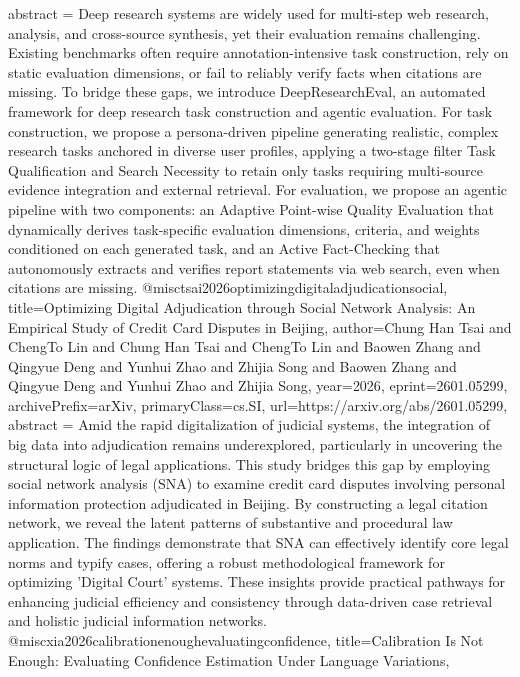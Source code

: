 {      abstract = {Deep research systems are widely used for multi-step web research, analysis, and cross-source synthesis, yet their evaluation remains challenging. Existing benchmarks often require annotation-intensive task construction, rely on static evaluation dimensions, or fail to reliably verify facts when citations are missing. To bridge these gaps, we introduce DeepResearchEval, an automated framework for deep research task construction and agentic evaluation. For task construction, we propose a persona-driven pipeline generating realistic, complex research tasks anchored in diverse user profiles, applying a two-stage filter Task Qualification and Search Necessity to retain only tasks requiring multi-source evidence integration and external retrieval. For evaluation, we propose an agentic pipeline with two components: an Adaptive Point-wise Quality Evaluation that dynamically derives task-specific evaluation dimensions, criteria, and weights conditioned on each generated task, and an Active Fact-Checking that autonomously extracts and verifies report statements via web search, even when citations are missing.}
}@misc{tsai2026optimizingdigitaladjudicationsocial,
      title={Optimizing Digital Adjudication through Social Network Analysis: An Empirical Study of Credit Card Disputes in Beijing}, 
      author={Chung Han Tsai and ChengTo Lin and Chung Han Tsai and ChengTo Lin and Baowen Zhang and Qingyue Deng and Yunhui Zhao and Zhijia Song and Baowen Zhang and Qingyue Deng and Yunhui Zhao and Zhijia Song},
      year={2026},
      eprint={2601.05299},
      archivePrefix={arXiv},
      primaryClass={cs.SI},
      url={https://arxiv.org/abs/2601.05299},
      abstract = {Amid the rapid digitalization of judicial systems, the integration of big data into adjudication remains underexplored, particularly in uncovering the structural logic of legal applications. This study bridges this gap by employing social network analysis (SNA) to examine credit card disputes involving personal information protection adjudicated in Beijing. By constructing a legal citation network, we reveal the latent patterns of substantive and procedural law application. The findings demonstrate that SNA can effectively identify core legal norms and typify cases, offering a robust methodological framework for optimizing 'Digital Court' systems. These insights provide practical pathways for enhancing judicial efficiency and consistency through data-driven case retrieval and holistic judicial information networks.}
}@misc{xia2026calibrationenoughevaluatingconfidence,
      title={Calibration Is Not Enough: Evaluating Confidence Estimation Under Language Variations}, 
}
